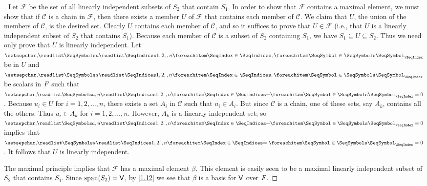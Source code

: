 \begin{proof}[]
  Let \(\mathcal{F}\) be the set of all linearly independent subsets of \(S_2\) that contain \(S_1\).
  In order to show that \(\mathcal{F}\) contains a maximal element, we must show that if \(\mathcal{C}\) is a chain in \(\mathcal{F}\), then there exists a member \(U\) of \(\mathcal{F}\) that contains each member of \(\mathcal{C}\).
  We claim that \(U\), the union of the members of \(\mathcal{C}\), is the desired set.
  Clearly \(U\) contains each member of \(\mathcal{C}\), and so it suffices to prove that \(U \in \mathcal{F}\)
  (i.e., that \(U\) is a linearly independent subset of \(S_2\) that contains \(S_1\)).
  Because each member of \(\mathcal{C}\) is a subset of \(S_2\) containing \(S_1\), we have \(S_1 \subseteq U \subseteq S_2\).
  Thus we need only prove that \(U\) is linearly independent.
  Let \(\seq{u}{1,2,,n}\) be in \(U\) and \(\seq{a}{1,2,,n}\) be scalars in \(\mathit{F}\) such that \(\seq[+]{a,u}{1,2,,n} = 0\).
  Because \(u_i \in U\) for \(i = 1, 2, \dots, n\), there exists a set \(A_i\) in \(\mathcal{C}\) such that \(u_i \in A_i\).
  But since \(\mathcal{C}\) is a chain, one of these sets, say \(A_k\), contains all the others.
  Thus \(u_i \in A_k\) for \(i = 1, 2, \dots, n\).
  However, \(A_k\) is a linearly independent set;
  so \(\seq[+]{a,u}{1,2,,n} = 0\) implies that \(\seq[=]{a}{1,2,,n} = 0\).
  It follows that \(U\) is linearly independent.

  The maximal principle implies that \(\mathcal{F}\) has a maximal element \(\beta\).
  This element is easily seen to be a maximal linearly independent subset of \(S_2\) that contains \(S_1\).
  Since \(\spn{S_2} = \V\), by \cref{1.12} we see that \(\beta\) is a basis for \(\mathsf{V}\) over \(\mathit{F}\).
\end{proof}
